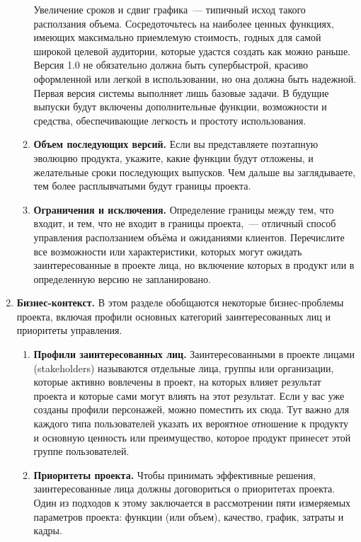 \documentclass{../../text-style}
\begin{document}
\begin{enumerate}
\begin{enumerate}
        Увеличение сроков и сдвиг графика~--- типичный исход такого расползания объема.
        Сосредоточьтесь на наиболее ценных функциях, имеющих максимально приемлемую стоимость, годных для самой широкой целевой аудитории, которые удастся создать как можно раньше.
        Версия 1.0 не обязательно должна быть супербыстрой, красиво оформленной или легкой в использовании, но она должна быть надежной.
        Первая версия системы выполняет лишь базовые задачи.
        В будущие выпуски будут включены дополнительные функции, возможности и средства, обеспечивающие легкость и простоту использования.
        \item \textbf{Объем последующих версий.}
        Если вы представляете поэтапную эволюцию продукта, укажите, какие функции будут отложены, и желательные сроки последующих выпусков.
        Чем дальше вы заглядываете, тем более расплывчатыми будут границы проекта.
        \item \textbf{Ограничения и исключения.}
        Определение границы между тем, что входит, и тем, что не входит в границы проекта,~--- отличный способ управления расползанием объёма и ожиданиями клиентов.
        Перечислите все возможности или характеристики, которых могут ожидать заинтересованные в проекте лица, но включение которых в продукт или в определенную версию не запланировано.
    \end{enumerate}
    \item \textbf{Бизнес-контекст.}
    В этом разделе обобщаются некоторые бизнес-проблемы проекта, включая профили основных категорий заинтересованных лиц и приоритеты управления.
    \begin{enumerate}
        \item \textbf{Профили заинтересованных лиц.}
        Заинтересованными в проекте лицами (stakeholders) называются отдельные лица, группы или организации, которые активно вовлечены в проект, на которых влияет результат проекта и которые сами могут влиять на этот результат.
        Если у вас уже созданы профили персонажей, можно поместить их сюда.
        Тут важно для каждого типа пользователей указать их вероятное отношение к продукту и основную ценность или преимущество, которое продукт принесет этой группе пользователей.
        \item \textbf{Приоритеты проекта.}
        Чтобы принимать эффективные решения, заинтересованные лица должны договориться о приоритетах проекта.
        Один из подходов к этому заключается в рассмотрении пяти измеряемых параметров проекта: функции (или объем), качество, график, затраты и кадры.

\end{enumerate}
\end{enumerate}
\end{document}
